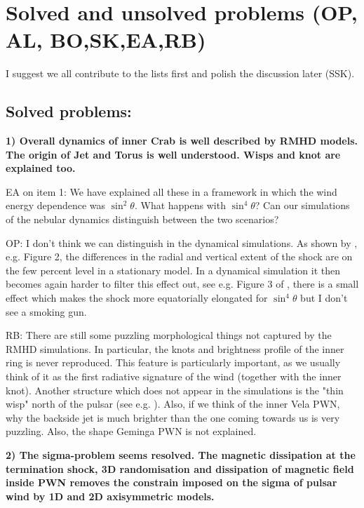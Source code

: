 \section{Solved and unsolved problems      (OP, AL, BO,SK,EA,RB)}
\label{sec:discussion}

I suggest we all contribute to the lists first and polish the discussion later (SSK). 

\subsection{Solved problems:}

\textbf{1) Overall dynamics of inner Crab is well described by RMHD models. The origin of Jet and Torus is well understood. Wisps and knot are explained too.}

EA on item 1: We have explained all these in a framework in which the wind energy dependence was $\sin^2\theta$. What happens with $\sin^4\theta$? Can our simulations of the nebular dynamics distinguish between the two scenarios?

OP: I don't think we can distinguish in the dynamical simulations.  As shown by \cite{LyutikovKomissarov2016}, e.g. Figure 2, the differences in the radial and vertical extent of the shock are on the few percent level in a stationary model.  In a dynamical simulation it then becomes again harder to filter this effect out, see e.g. Figure 3 of \cite{BuhlerGiomi2016}, there is a small effect which makes the shock more equatorially elongated for $\sin^4\theta$ but I don't see a smoking gun.  

RB: There are still some puzzling morphological things not captured by the RMHD simulations. In particular, the knots and brightness profile of the inner ring is never reproduced. This feature is particularly important, as we usually think of it as the first radiative signature of the wind (together with the inner knot). Another structure which does not appear in the simulations is the "thin wisp" north of the pulsar (see e.g. \cite{Hester_1995}). Also, if we think of the inner Vela PWN, why the backside jet is much brighter than the one coming towards us is very puzzling. Also, the shape Geminga PWN is not explained.

\textbf{2) The sigma-problem seems resolved. The magnetic dissipation at the termination shock, 3D randomisation and dissipation of magnetic field inside PWN removes the constrain imposed on the sigma of pulsar wind by 1D and 2D axisymmetric models.}

